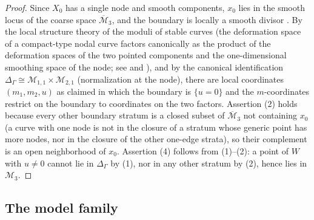\documentclass[11pt]{amsart}
\newcommand{\M}{\mathcal{M}}
\theoremstyle{plain}
\theoremstyle{definition}
\theoremstyle{remark}
\begin{document}
\begin{proof}
Since $X_0$ has a single node and smooth components, $x_0$ lies in the smooth locus
of the coarse space $\overline{\M}_3$, and the boundary is locally a smooth divisor
\cite{DM,Knudsen}. By the local structure theory of the moduli of stable curves
(the deformation space of a compact-type nodal curve factors canonically as the
product of the deformation spaces of the two pointed components and the one-dimensional
smoothing space of the node; see \cite[Ch.~XII]{ACGII} and \cite{Sernesi}), and by the
canonical identification $\Delta_\Gamma\cong \M_{1,1}\times\M_{2,1}$ (normalization
at the node), there are local coordinates $(m_1,m_2,u)$ as claimed in which the
boundary is $\{u=0\}$ and the $m$-coordinates restrict on the boundary to coordinates
on the two factors. Assertion (2) holds because every other boundary stratum is a
closed subset of $\overline{\M}_3$ not containing $x_0$ (a curve with one node is
not in the closure of a stratum whose generic point has more nodes, nor in the
closure of the other one-edge strata), so their complement is an open neighborhood of
$x_0$. Assertion (4) follows from (1)--(2): a point of $W$ with $u\ne0$ cannot lie in
$\Delta_\Gamma$ by (1), nor in any other stratum by (2), hence lies in $\M_3$.
\end{proof}

\subsection{The model family}
\end{document}
